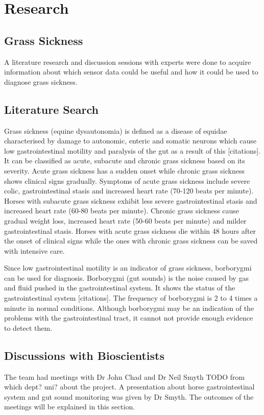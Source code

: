 \chapter{Research}


\section{Grass Sickness}
A literature research and discussion sessions with experts were done to acquire information about which sensor data could be useful and how it could be used to diagnose grass sickness.  


\section{Literature Search}
Grass sickness (equine dysautonomia) is defined as a disease of equidae characterised by damage to autonomic, enteric and somatic neurons which cause low gastrointestinal motility and paralysis of the gut as a result of this [citations]. It can be classified as acute, subacute and chronic grass sickness based on its severity. Acute grass sickness has a sudden onset while chronic grass sickness shows clinical signs gradually. Symptoms of acute grass sickness include severe colic, gastrointestinal stasis and increased heart rate (70-120 beats per minute). Horses with subacute grass sickness exhibit less severe gastrointestinal stasis and increased heart rate (60-80 beats per minute). Chronic grass sickness cause gradual weight loss, increased heart rate (50-60 beats per minute) and milder gastrointestinal stasis. Horses with acute grass sickness die within 48 hours after the onset of clinical signs while the ones with chronic grass sickness can be saved with intensive care.

Since low gastrointestinal motility is an indicator of grass sickness, borborygmi can be used for diagnosis. Borborygmi (gut sounds) is the noise caused by gas and fluid pushed in the gastrointestinal system. It shows the status of the gastrointestinal system [citations]. The frequency of borborygmi is 2 to 4 times a minute in normal conditions. Although borborygmi may be an indication of the problems with the gastrointestinal tract, it cannot not provide enough evidence to detect them.

\section{Discussions with Bioscientists}
The team had meetings with Dr John Chad and Dr Neil Smyth TODO from which dept? uni? about the project. A presentation about horse gastrointestinal system and gut sound monitoring was given by Dr Smyth. The outcomes of the meetings will be explained in this section. 

